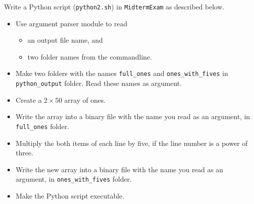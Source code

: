 \question[25]

Write a Python script (\texttt{python2.sh}) in \texttt{MidtermExam} as described below.
\begin{itemize}
\item Use argument parser module to read
\begin{itemize}
\item an output file name, and
\item two folder names from the commandline.
\end{itemize}
\item Make two folders with the names \texttt{full\_ones} and \texttt{ones\_with\_fives} in \texttt{python\_output} folder. Read these names as argument.
\item Create a $2\times50$ array of ones.
\item Write the array into a binary file with the name you read as an argument, in \texttt{full\_ones} folder.
\item Multiply the both items of each line by five, if the line number is a power of three.
\item Write the new array into a binary file with the name you read as an argument, in \texttt{ones\_with\_fives} folder.
\item Make the Python script executable.
\end{itemize}


